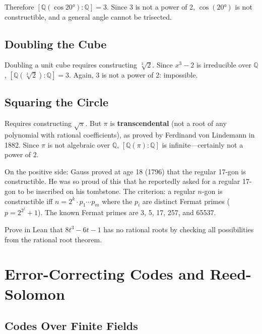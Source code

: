 \documentclass[11pt, a4paper, oneside]{book}
\newcommand{\Q}{\mathbb{Q}}
\newcounter{exercise}[chapter]
\begin{document}
Therefore $[\Q(\cos 20°):\Q] = 3$. Since 3 is not a power of 2, $\cos(20°)$
is not constructible, and a general angle cannot be trisected.

\section{Doubling the Cube}

Doubling a unit cube requires constructing $\sqrt[3]{2}$. Since $x^3 - 2$ is
irreducible over $\Q$, $[\Q(\sqrt[3]{2}):\Q] = 3$. Again, 3 is not a power
of 2: impossible.

\section{Squaring the Circle}

Requires constructing $\sqrt{\pi}$. But $\pi$ is \textbf{transcendental}
(not a root of any polynomial with rational coefficients), as proved by
Ferdinand von Lindemann in 1882. Since $\pi$ is not algebraic over $\Q$,
$[\Q(\pi):\Q]$ is infinite---certainly not a power of 2.

\begin{historical}[title={Gauss and the 17-gon}]
On the positive side: Gauss proved at age 18 (1796) that the regular 17-gon
is constructible. He was so proud of this that he reportedly asked for a
regular 17-gon to be inscribed on his tombstone. The criterion: a regular
$n$-gon is constructible iff $n = 2^k \cdot p_1 \cdots p_m$ where the $p_i$
are distinct Fermat primes ($p = 2^{2^j} + 1$). The known Fermat primes are
3, 5, 17, 257, and 65537.
\end{historical}

\begin{exercisebox}[title={Exercise 13.1}]
Prove in Lean that $8t^3 - 6t - 1$ has no rational roots by checking all
possibilities from the rational root theorem.
\end{exercisebox}

\chapter{Error-Correcting Codes and Reed-Solomon}

\section{Codes Over Finite Fields}
\end{document}

